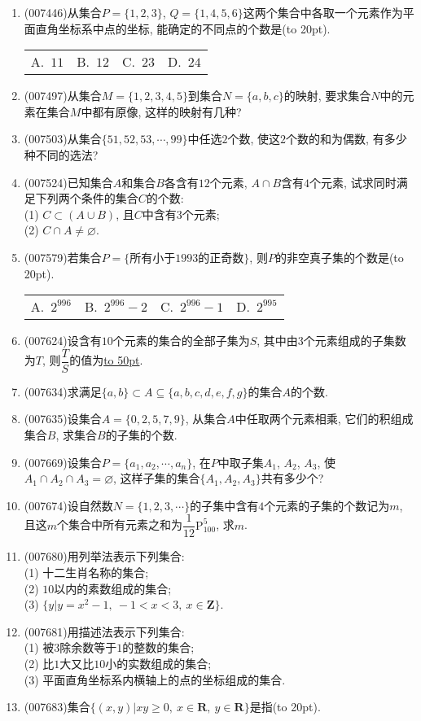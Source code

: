 \documentclass[10pt,a4paper]{article}
\newcommand{\blank}[1]{\underline{\hbox to #1pt{}}}
\newcommand{\bracket}[1]{(\hbox to #1pt{})}
\newcommand{\fourch}[4]{\par\begin{tabular}{p{.23\textwidth}p{.23\textwidth}p{.23\textwidth}p{.23\textwidth}}
A.~#1 &B.~#2& C.~#3& D.~#4
\end{tabular}}
\begin{document}
\begin{enumerate}[1.]
\item {\tiny (007446)}从集合$P=\{1,2,3\}$, $Q=\{1,4,5,6\}$这两个集合中各取一个元素作为平面直角坐标系中点的坐标, 能确定的不同点的个数是\bracket{20}.
\fourch{$11$}{$12$}{$23$}{$24$}
\item {\tiny (007497)}从集合$M=\{1,2,3,4,5\}$到集合$N=\{a,b,c\}$的映射, 要求集合$N$中的元素在集合$M$中都有原像, 这样的映射有几种?
\item {\tiny (007503)}从集合$\{51,52,53,\cdots ,99\}$中任选$2$个数, 使这$2$个数的和为偶数, 有多少种不同的选法?
\item {\tiny (007524)}已知集合$A$和集合$B$各含有$12$个元素, $A\cap B$含有$4$个元素, 试求同时满足下列两个条件的集合$C$的个数:\\
(1) $C\subset (A\cup B)$, 且$C$中含有$3$个元素;\\
(2) $C\cap A\ne \varnothing$.
\item {\tiny (007579)}若集合$P=\{\text{所有小于}1993\text{的正奇数}\}$, 则$P$的非空真子集的个数是\bracket{20}.
\fourch{$2^{996}$}{$2^{996}-2$}{$2^{996}-1$}{$2^{995}$}
\item {\tiny (007624)}设含有$10$个元素的集合的全部子集为$S$, 其中由$3$个元素组成的子集数为$T$, 则$\dfrac TS$的值为\blank{50}.
\item {\tiny (007634)}求满足$\{a,b\}\subset A\subseteq \{a,b,c,d,e,f,g\}$的集合$A$的个数.
\item {\tiny (007635)}设集合$A=\{0,2,5,7,9\}$, 从集合$A$中任取两个元素相乘, 它们的积组成集合$B$, 求集合$B$的子集的个数.
\item {\tiny (007669)}设集合$P=\{a_1,a_2,\cdots ,a_n\}$, 在$P$中取子集$A_1$, $A_2$, $A_3$, 使$A_1\cap A_2\cap A_3=\varnothing$, 这样子集的集合$\{A_1,A_2,A_3\}$共有多少个?
\item {\tiny (007674)}设自然数$N=\{1,2,3,\cdots\}$的子集中含有$4$个元素的子集的个数记为$m$, 且这$m$个集合中所有元素之和为$\dfrac 1{12}\mathrm{P}_{100}^5$, 求$m$.
\item {\tiny (007680)}用列举法表示下列集合:\\
(1) 十二生肖名称的集合;\\
(2) $10$以内的素数组成的集合;\\
(3) $\{y|y=x^2-1, \ -1<x<3, \ x\in \mathbf{Z}\}$.
\item {\tiny (007681)}用描述法表示下列集合:\\
(1) 被$3$除余数等于$1$的整数的集合;\\
(2) 比$1$大又比$10$小的实数组成的集合;\\
(3) 平面直角坐标系内横轴上的点的坐标组成的集合.
\item {\tiny (007683)}集合$\{(x,y)|xy\ge 0, \ x\in \mathbf{R}, \ y\in \mathbf{R}\}$是指\bracket{20}.

\end{enumerate}
\end{document}
